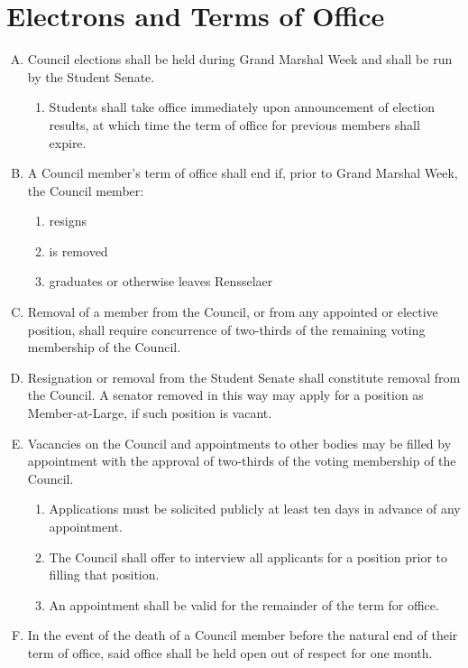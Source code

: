 \documentclass[letterpaper,12pt]{article}
\begin{document}
\section{Electrons and Terms of Office}
\begin{enumerate}[A.]
	\item Council elections shall be held during Grand Marshal Week and shall be run by the Student Senate.
	\begin{enumerate}[1.]
		\item Students shall take office immediately upon announcement of election results, at which time the term of office for previous members shall expire.
	\end{enumerate}
	\item A Council member’s term of office shall end if, prior to Grand Marshal Week, the Council member:
	\begin{enumerate}[1.]
		\item resigns
		\item is removed
		\item graduates or otherwise leaves Rensselaer
	\end{enumerate} 
	\item Removal of a member from the Council, or from any appointed or elective position, shall require concurrence of two-­thirds of the remaining voting membership of the Council.
	\item Resignation or removal from the Student Senate shall constitute removal from the Council. A senator removed in this way may apply for a position as Member­-at-­Large, if such position is vacant.
	\item Vacancies on the Council and appointments to other bodies may be filled by appointment with the approval of two­-thirds of the voting membership of the Council.
	\begin{enumerate}[1.]
		\item Applications must be solicited publicly at least ten days in advance of any appointment.
		\item The Council shall offer to interview all applicants for a position prior to filling that position.
		\item An appointment shall be valid for the remainder of the term for office.
	\end{enumerate}
	\item In the event of the death of a Council member before the natural end of their term of office, said office shall be held open out of respect for one month.
\end{enumerate}
\end{document}
